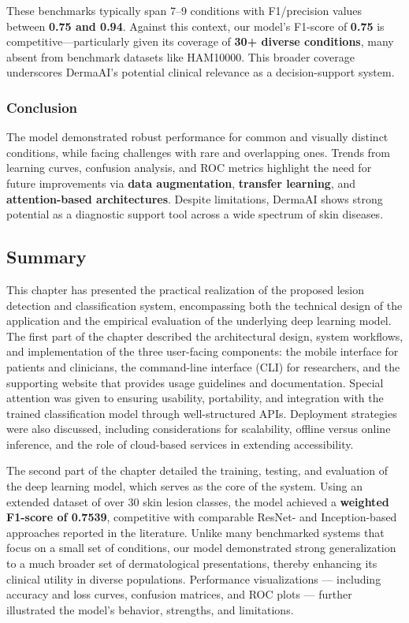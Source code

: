 \documentclass[
  12pt,
  oneside]{article}
\begin{document}
These benchmarks typically span 7--9 conditions with F1/precision values
between \textbf{0.75 and 0.94}. Against this context, our model's
F1-score of \textbf{0.75} is competitive---particularly given its
coverage of \textbf{30+ diverse conditions}, many absent from benchmark
datasets like HAM10000. This broader coverage underscores DermaAI's
potential clinical relevance as a decision-support system.

\subsubsection{Conclusion}\label{conclusion-3}

The model demonstrated robust performance for common and visually
distinct conditions, while facing challenges with rare and overlapping
ones. Trends from learning curves, confusion analysis, and ROC metrics
highlight the need for future improvements via \textbf{data
augmentation}, \textbf{transfer learning}, and \textbf{attention-based
architectures}. Despite limitations, DermaAI shows strong potential as a
diagnostic support tool across a wide spectrum of skin diseases.

\subsection{Summary}\label{summary-2}

This chapter has presented the practical realization of the proposed
lesion detection and classification system, encompassing both the
technical design of the application and the empirical evaluation of the
underlying deep learning model. The first part of the chapter described
the architectural design, system workflows, and implementation of the
three user-facing components: the mobile interface for patients and
clinicians, the command-line interface (CLI) for researchers, and the
supporting website that provides usage guidelines and documentation.
Special attention was given to ensuring usability, portability, and
integration with the trained classification model through
well-structured APIs. Deployment strategies were also discussed,
including considerations for scalability, offline versus online
inference, and the role of cloud-based services in extending
accessibility.

The second part of the chapter detailed the training, testing, and
evaluation of the deep learning model, which serves as the core of the
system. Using an extended dataset of over 30 skin lesion classes, the
model achieved a \textbf{weighted F1-score of 0.7539}, competitive with
comparable ResNet- and Inception-based approaches reported in the
literature. Unlike many benchmarked systems that focus on a small set of
conditions, our model demonstrated strong generalization to a much
broader set of dermatological presentations, thereby enhancing its
clinical utility in diverse populations. Performance visualizations ---
including accuracy and loss curves, confusion matrices, and ROC plots
--- further illustrated the model's behavior, strengths, and
limitations.
\end{document}
